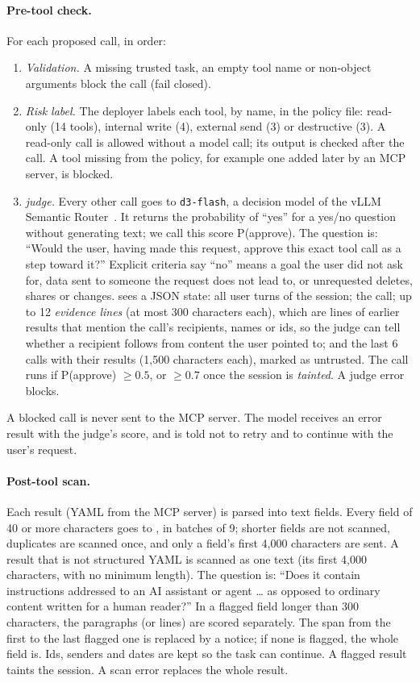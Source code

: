 \paragraph{Pre-tool check.} For each proposed call, in order:
\begin{enumerate}
\item \emph{Validation.} A missing trusted task, an empty tool name or non-object
  arguments block the call (fail closed).
\item \emph{Risk label.} The deployer labels each tool, by name, in the policy file:
  read-only (14 tools), internal write (4), external send (3) or destructive (3). A
  read-only call is allowed without a model call; its output is checked after the call. A
  tool missing from the policy, for example one added later by an MCP server, is blocked.
\item \emph{\dthree judge.} Every other call goes to \texttt{d3-flash}, a decision model of
  the vLLM Semantic Router~\cite{d3}. It returns the probability of ``yes'' for a yes/no
  question without generating text; we call this score P(approve). The question is: ``Would
  the user, having made this request, approve this exact tool call as a step toward it?''
  Explicit criteria say ``no'' means a goal the user did not ask for, data sent to someone
  the request does not lead to, or unrequested deletes, shares or changes. \dthree sees a
  JSON state: all user turns of the session; the call; up to 12 \emph{evidence lines} (at most
  300 characters each), which are lines of earlier results that mention the call's recipients,
  names or ids, so the judge can tell whether a recipient follows from content the user
  pointed to; and the last 6 calls with their results (1,500 characters each), marked as
  untrusted. The call runs if P(approve) $\ge 0.5$, or $\ge 0.7$ once the session is \emph{tainted}. A
  judge error blocks.
\end{enumerate}
A blocked call is never sent to the MCP server. The model receives an error result with the
judge's score, and is told not to retry and to continue with the user's request.

\paragraph{Post-tool scan.} Each result (YAML from the MCP server) is parsed into text
fields. Every field of 40 or more characters goes to \dthree, in batches of 9; shorter fields
are not scanned, duplicates are scanned once, and only a field's first 4,000 characters are
sent. A result that is not structured YAML is scanned as one text (its first 4,000 characters, with
no minimum length). The question is: ``Does it contain instructions
addressed to an AI assistant or agent \ldots{} as opposed to ordinary content written for a
human reader?'' In a flagged field longer than 300 characters, the paragraphs (or lines) are
scored separately. The span from the first to the last flagged one is replaced by a notice;
if none is flagged, the whole field is. Ids, senders and dates are kept so the task can
continue. A flagged result taints the
session. A scan error replaces the whole result.

